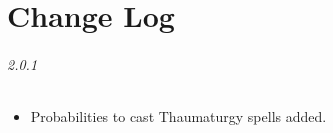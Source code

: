 \part{Change Log}
\label{change_log}

\paragraph{2.0.1}

\begin{itemize}
\item Probabilities to cast Thaumaturgy spells added.
\end{itemize}
